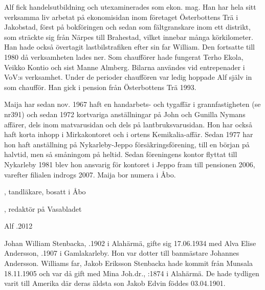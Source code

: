 Alf fick handelsutbildning och utexaminerades som ekon. mag. Han har hela sitt verksamma liv arbetat på ekonomisidan inom företaget Österbottens Trä i Jakobstad, först på bokföringen och sedan som fältgranskare inom ett distrikt, som sträckte sig från Närpes till Brahestad, vilket innebar många körkilometer. Han hade också övertagit lastbilstrafiken efter sin far William. Den fortsatte till 1980 då verksamheten lades ner. Som chaufförer hade fungerat Terho Ekola, Veikko Kontio och sist Manne Almberg. Bilarna användes vid entrepenader i VoV:s verksamhet. Under de perioder chauffören var ledig hoppade Alf själv in som chaufför. Han gick i pension från Österbottens Trä 1993.

Maija har sedan nov. 1967 haft en handarbets- och tygaffär i grannfastigheten (se nr391) och sedan 1972 kortvariga anställningar på John och Gunilla Nymans affärer, dels inom matvarusidan och dels på lantbruksvarusidan. Hon har också haft korta inhopp i Mirkakontoret och i ortens Kemikalia-affär. Sedan 1977 har hon  haft anställning på Nykarleby-Jeppo försäkringsförening, till en början på halvtid, men så småningom på heltid. Sedan föreningens kontor flyttat till Nykarleby 1981 blev hon ansvarig för kontoret i Jeppo fram till pensionen 2006, varefter filialen indrogs 2007. Maija bor numera i Åbo.
\begin{jhchildren}
  \item {}, tandläkare, bosatt i Åbo
  \item {}, redaktör på Vasabladet
\end{jhchildren}

Alf .2012


Johan William Stenbacka, .1902 i Alahärmä, gifte sig 17.06.1934 med Alva Elise Andersson, .1907 i Gamlakarleby. Hon var dotter till banmästare Johannes Andersson. Williams far, Jakob Eriksson Stenbacka hade kommit från Munsala 18.11.1905 och var då gift med Mina Joh.dr., :1874 i Alahärmä. De hade tydligen varit till Amerika där deras äldsta son Jakob Edvin föddes 03.04.1901.

